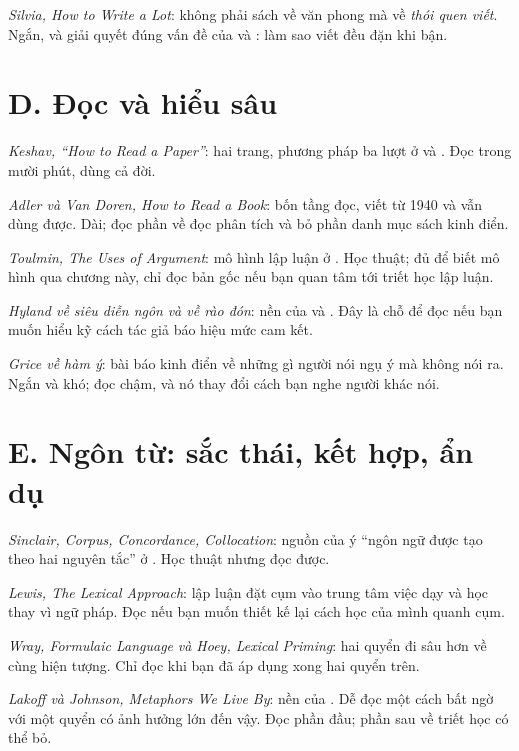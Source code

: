 \documentclass[english.tex]{subfiles}
\begin{document}
\emph{Silvia, \emph{How to Write a Lot}}\cite{silvia2007}: không phải sách về văn phong mà về \emph{thói quen viết}. Ngắn, và giải quyết đúng vấn đề của  và : làm sao viết đều đặn khi bận.

\section*{D. Đọc và hiểu sâu}

\emph{Keshav, ``How to Read a Paper''}\cite{keshav2007}: hai trang, phương pháp ba lượt ở  và . Đọc trong mười phút, dùng cả đời.

\emph{Adler và Van Doren, \emph{How to Read a Book}}\cite{adler1972}: bốn tầng đọc, viết từ 1940 và vẫn dùng được. Dài; đọc phần về đọc phân tích và bỏ phần danh mục sách kinh điển.

\emph{Toulmin, \emph{The Uses of Argument}}\cite{toulmin1958}: mô hình lập luận ở . Học thuật; đủ để biết mô hình qua chương này, chỉ đọc bản gốc nếu bạn quan tâm tới triết học lập luận.

\emph{Hyland về siêu diễn ngôn}\cite{hyland2005} \emph{và về rào đón}\cite{hyland1998}: nền của  và . Đây là chỗ để đọc nếu bạn muốn hiểu kỹ cách tác giả báo hiệu mức cam kết.

\emph{Grice về hàm ý}\cite{grice1975}: bài báo kinh điển về những gì người nói ngụ ý mà không nói ra. Ngắn và khó; đọc chậm, và nó thay đổi cách bạn nghe người khác nói.

\section*{E. Ngôn từ: sắc thái, kết hợp, ẩn dụ}

\emph{Sinclair, \emph{Corpus, Concordance, Collocation}}\cite{sinclair1991}: nguồn của ý ``ngôn ngữ được tạo theo hai nguyên tắc'' ở . Học thuật nhưng đọc được.

\emph{Lewis, \emph{The Lexical Approach}}\cite{lewis1993}: lập luận đặt cụm vào trung tâm việc dạy và học thay vì ngữ pháp. Đọc nếu bạn muốn thiết kế lại cách học của mình quanh cụm.

\emph{Wray, \emph{Formulaic Language}}\cite{wray2002} \emph{và Hoey, \emph{Lexical Priming}}\cite{hoey2005}: hai quyển đi sâu hơn về cùng hiện tượng. Chỉ đọc khi bạn đã áp dụng xong hai quyển trên.

\emph{Lakoff và Johnson, \emph{Metaphors We Live By}}\cite{lakoff1980}: nền của . Dễ đọc một cách bất ngờ với một quyển có ảnh hưởng lớn đến vậy. Đọc phần đầu; phần sau về triết học có thể bỏ.
\end{document}
